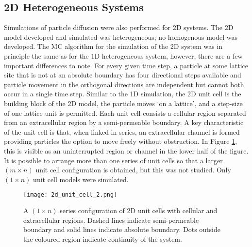 \subsection{2D Heterogeneous Systems}
\label{section:mc-sims-2D}
	Simulations of particle diffusion were also performed for 2D systems. The 2D model developed and simulated was heterogeneous; no homogenous model was developed. The MC algorithm for the simulation of the 2D system was in principle the same as for the 1D heterogeneous system, however, there are a few important differences to note. For every given time step, a particle at some lattice site that is not at an absolute boundary has four directional steps available and particle movement in the orthogonal directions are independent but cannot both occur in a single time step. Similar  to the 1D simulation, the 2D unit cell is the building block of the 2D model, the particle moves `on a lattice', and a step-size of one lattice unit is permitted. Each unit cell consists a cellular region separated from an extracellular region by a semi-permeable boundary. A key characteristic of the unit cell is that, when linked in series, an extracellular channel is formed providing particles the option to move freely without obstruction. In Figure \ref{fig:2d_unit_cell_2.png}, this is visible as an uninterrupted region or channel in the lower half of the figure. It is possible to arrange more than one series of unit cells so that a larger $\left(  m \times n \right) $ unit cell configuration is obtained, but this was not studied. Only $\left(  1 \times n \right) $ unit cell models were simulated. 
	
	\begin{figure}[h]
		\centering
		\texttt{[image: 2d\_unit\_cell\_2.png]}
		\caption[Series configuration of heterogeneous 2D unit cells]{A $ \left( 1 \times n \right) $ series configuration of 2D unit cells with cellular and extracellular regions. Dashed lines indicate semi-permeable boundary and solid lines indicate absolute boundary. Dots outside the coloured region indicate continuity of the system.}
		\label{fig:2d_unit_cell_2.png}
	\end{figure}
	
